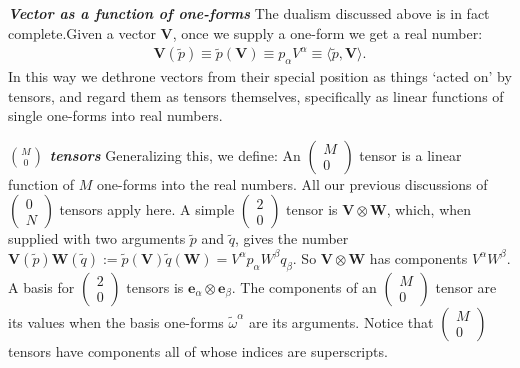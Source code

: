 \documentclass[12pt]{book}
\begin{document}
    \textit{\textbf{Vector as a function of one-forms}}
    The dualism discussed above is in fact complete.Given a vector \(\mathbf{V}\), once we supply a one-form we get a real number:
    \begin{align}
    \mathbf{V}(\tilde{p}) \equiv \tilde{p}(\mathbf{V}) \equiv p_\alpha V^\alpha \equiv \langle \tilde{p}, \mathbf{V} \rangle. \tag{3.54}
    \end{align}
    In this way we dethrone vectors from their special position as things ‘acted on’ by tensors, and regard them as tensors themselves, specifically as linear functions of single one-forms into real numbers.
    
    \textit{\textbf{\(\binom{M}{0}\) tensors}}
    Generalizing this, we define:
    An \(\left(\begin{array}{c} M \\ 0 \end{array}\right)\) tensor is a linear function of \(M\) one-forms into the real numbers. All our previous discussions of \(\left(\begin{array}{c} 0 \\ N \end{array}\right)\) tensors apply here. A simple \(\left(\begin{array}{c} 2 \\ 0 \end{array}\right)\) tensor is \(\mathbf{V} \otimes \mathbf{W}\), which, when supplied with two arguments \(\tilde{p}\) and \(\tilde{q}\), gives the number \(\mathbf{V}(\tilde{p})\mathbf{W}(\tilde{q}) := \tilde{p}(\mathbf{V})\tilde{q}(\mathbf{W}) = V^\alpha p_\alpha W^\beta q_\beta\). So \(\mathbf{V} \otimes \mathbf{W}\) has components \(V^\alpha W^\beta\). A basis for \(\left(\begin{array}{c} 2 \\ 0 \end{array}\right)\) tensors is \(\mathbf{e}_\alpha \otimes \mathbf{e}_\beta\). The components of an \(\left(\begin{array}{c} M \\ 0 \end{array}\right)\) tensor are its values when the basis one-forms \(\tilde{\omega}^\alpha\) are its arguments. Notice that \(\left(\begin{array}{c} M \\ 0 \end{array}\right)\) tensors have components all of whose indices are superscripts.
\end{document}
